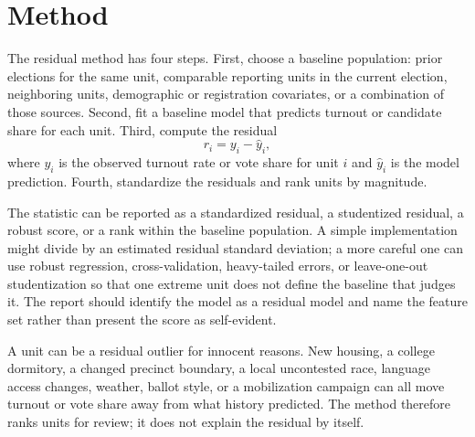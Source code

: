 \section{Method}

The residual method has four steps. First, choose a baseline population: prior
elections for the same unit, comparable reporting units in the current election,
neighboring units, demographic or registration covariates, or a combination of
those sources. Second, fit a baseline model that predicts turnout or candidate
share for each unit. Third, compute the residual
\[
  r_i = y_i - \widehat{y}_i,
\]
where $y_i$ is the observed turnout rate or vote share for unit $i$ and
$\widehat{y}_i$ is the model prediction. Fourth, standardize the residuals and
rank units by magnitude.

The statistic can be reported as a standardized residual, a studentized
residual, a robust score, or a rank within the baseline population. A simple
implementation might divide by an estimated residual standard deviation; a more
careful one can use robust regression, cross-validation, heavy-tailed errors,
or leave-one-out studentization so that one extreme unit does not define the
baseline that judges it. The report should identify the model as a residual
model and name the feature set rather than present the score as self-evident.

A unit can be a residual outlier for innocent reasons. New housing, a college
dormitory, a changed precinct boundary, a local uncontested race, language
access changes, weather, ballot style, or a mobilization campaign can all move
turnout or vote share away from what history predicted. The method therefore
ranks units for review; it does not explain the residual by itself.
